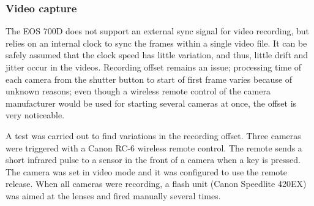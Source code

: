 
%


\subsubsection{Video capture}


The EOS 700D does not support an external sync signal for video recording, but relies on an internal clock to sync the frames within a single video file.
It can be safely assumed that the clock speed has little variation, and thus, little drift and jitter occur in the videos.
Recording offset remains an issue;
processing time of each camera from the shutter button to start of first frame varies because of unknown reasons; even though a wireless remote control of the camera manufacturer would be used for starting several cameras at once, the offset is very noticeable.


A test was carried out to find variations in the recording offset.
Three cameras were triggered with a Canon RC-6 wireless remote control.
The remote sends a short infrared pulse to a sensor in the front of a camera when a key is pressed.
The camera was set in video mode and it was configured to use the remote release.
When all cameras were recording, a flash unit (Canon Speedlite 420EX) was aimed at the lenses and fired manually several times.

